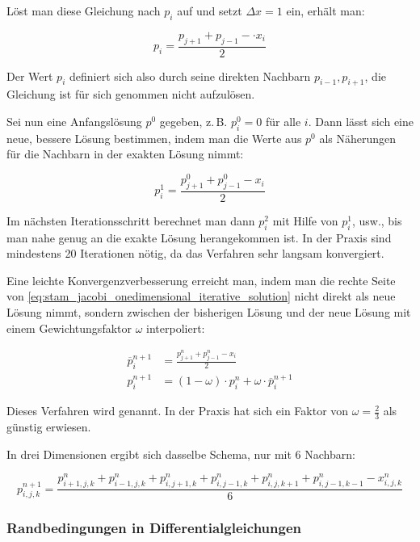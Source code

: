 Löst man diese Gleichung nach $p_i$ auf und setzt $\Delta x = 1$ ein, erhält
man:

\begin{equation}
p_i
=
\frac{
	p_{j+1} +
	p_{j-1} -
	\cdot x_i
}
{
	2
}
\end{equation}

Der Wert $p_i$ definiert sich also durch seine direkten Nachbarn $p_{i-1},
p_{i+1}$, die Gleichung ist für sich genommen nicht aufzulösen.

Sei nun eine Anfangslösung $p^0$ gegeben, z.\,B. $p^0_i = 0$ für alle $i$.
Dann lässt sich eine neue, bessere Lösung bestimmen, indem man die Werte aus
$p^0$ als Näherungen für die Nachbarn in der exakten Lösung nimmt:

\begin{equation}
\label{eq:stam_jacobi_onedimensional_iterative_solution}
p_i^1
=
\frac{
	p_{j+1}^{0} + p_{j-1}^{0} - x_i
}
{
	2
}
\end{equation}

Im nächsten Iterationsschritt berechnet man dann $p_i^2$ mit Hilfe von $p_i^1$,
usw., bis man nahe genug an die exakte Lösung herangekommen ist. In der Praxis
sind mindestens 20 Iterationen nötig, da das Verfahren sehr langsam konvergiert.

Eine leichte Konvergenzverbesserung erreicht man, indem man die rechte Seite von
\autoref{eq:stam_jacobi_onedimensional_iterative_solution} nicht direkt als neue
Lösung nimmt, sondern zwischen der bisherigen Lösung und der neue Lösung mit
einem Gewichtungsfaktor $\omega$ interpoliert:

\begin{align}
\overline{p}_i^{n+1}
&=
\frac{
	p_{j+1}^{n} + p_{j-1}^{n} - x_i
}
{
	2
} \\
p_i^{n+1}
&=
(1-\omega) \cdot p_i^n + \omega \cdot \overline{p}_i^{n+1}
\end{align}

Dieses Verfahren wird  genannt. In
der Praxis hat sich ein Faktor von $\omega=\frac{2}{3}$ als günstig erwiesen.

In drei Dimensionen ergibt sich dasselbe Schema, nur mit 6 Nachbarn:

\begin{equation*}
p_{i,j,k}^{n+1}
=
\frac{
	p_{i+1,j,k}^n +
	p_{i-1,j,k}^n +
	p_{i,j+1,k}^n +
	p_{i,j-1,k}^n +
	p_{i,j,k+1}^n +
	p_{i,j-1,k-1}^n -
	x_{i,j,k}^n
}
{
	6
}
\end{equation*}

\subsubsection{Randbedingungen in Differentialgleichungen}

